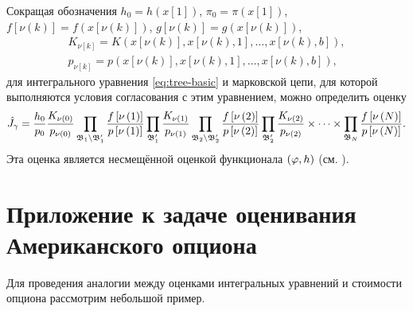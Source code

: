 Сокращая обозначения $h_0 = h(x[1])$, $\pi_0 = \pi(x[1])$, $f[\nu(k)] = f\left(x\left[\nu\left(k\right)\right]\right)$, $g[\nu(k)] = g\left(x\left[\nu\left(k\right)\right]\right)$, 
\begin{align*}
K_{\nu[k]} = K\left(x\left[\nu(k)\right], x\left[\nu(k),1\right], \ldots ,x\left[\nu(k),b\right]\right), \\
p_{\nu[k]} = p\left(x\left[\nu(k)\right], x\left[\nu(k),1\right], \ldots ,x\left[\nu(k),b\right]\right),
\end{align*}
для интегрального уравнения \eqref{eq:tree-basic} и марковской цепи, для которой выполняются условия согласования с этим уравнением, можно определить оценку
\begin{equation}\label{eq:accumulation-estimator}
	\hat{J}_\gamma = \frac{h_0}{p_0}\frac{K_{\nu(0)}}{p_{\nu(0)}}\prod_{\mathfrak{B}_1\setminus\mathfrak{B}'_1}\frac{f\left[\nu\left(1\right)\right]}{p\left[\nu\left(1\right)\right]}\prod_{\mathfrak{B}'_1} \frac{K_{\nu(1)}}{p_{\nu(1)}}\prod_{\mathfrak{B}_2\setminus\mathfrak{B}'_2}\frac{f\left[\nu\left(2\right)\right]}{p\left[\nu\left(2\right)\right]}\prod_{\mathfrak{B}'_2} \frac{K_{\nu(2)}}{p_{\nu(2)}}\times\cdots\times\prod_{\mathfrak{B}_N} \frac{f\left[\nu\left(N\right)\right]}{p\left[\nu\left(N\right)\right]}.
\end{equation}
Эта оценка является несмещённой оценкой функционала $\left(\varphi, h\right)$ (см. \cite{montekarlo1975}).


\section{Приложение к задаче оценивания Американского опциона}
Для проведения аналогии между оценками интегральных уравнений и стоимости опциона рассмотрим небольшой пример.

